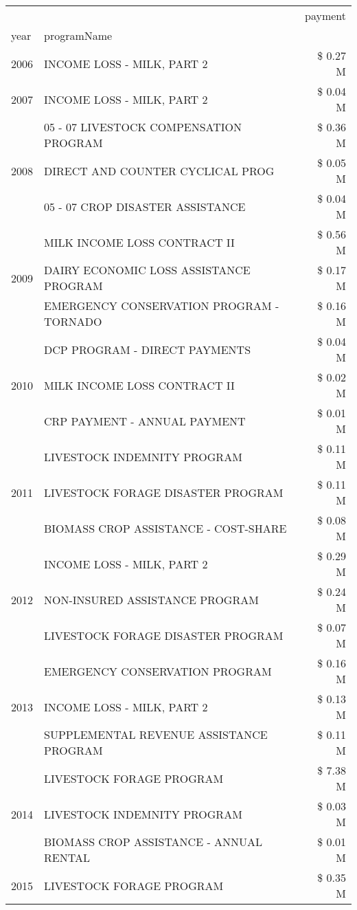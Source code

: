 \begin{tabular}{llr}
\toprule
 &  & payment \\
year & programName &  \\
\midrule
2006 & INCOME LOSS - MILK, PART 2 & \$ 0.27 M \\
\cline{1-3}
2007 & INCOME LOSS - MILK, PART 2 & \$ 0.04 M \\
\cline{1-3}
\multirow[t]{3}{*}{2008} & 05 - 07 LIVESTOCK COMPENSATION PROGRAM & \$ 0.36 M \\
 & DIRECT AND COUNTER CYCLICAL PROG & \$ 0.05 M \\
 & 05 - 07 CROP DISASTER ASSISTANCE & \$ 0.04 M \\
\cline{1-3}
\multirow[t]{3}{*}{2009} & MILK INCOME LOSS CONTRACT II & \$ 0.56 M \\
 & DAIRY ECONOMIC LOSS ASSISTANCE PROGRAM & \$ 0.17 M \\
 & EMERGENCY CONSERVATION PROGRAM - TORNADO & \$ 0.16 M \\
\cline{1-3}
\multirow[t]{3}{*}{2010} & DCP PROGRAM - DIRECT PAYMENTS & \$ 0.04 M \\
 & MILK INCOME LOSS CONTRACT II & \$ 0.02 M \\
 & CRP PAYMENT - ANNUAL PAYMENT & \$ 0.01 M \\
\cline{1-3}
\multirow[t]{3}{*}{2011} & LIVESTOCK INDEMNITY PROGRAM & \$ 0.11 M \\
 & LIVESTOCK FORAGE DISASTER PROGRAM & \$ 0.11 M \\
 & BIOMASS CROP ASSISTANCE - COST-SHARE & \$ 0.08 M \\
\cline{1-3}
\multirow[t]{3}{*}{2012} & INCOME LOSS - MILK, PART 2 & \$ 0.29 M \\
 & NON-INSURED ASSISTANCE PROGRAM & \$ 0.24 M \\
 & LIVESTOCK FORAGE DISASTER PROGRAM & \$ 0.07 M \\
\cline{1-3}
\multirow[t]{3}{*}{2013} & EMERGENCY CONSERVATION PROGRAM & \$ 0.16 M \\
 & INCOME LOSS - MILK, PART 2 & \$ 0.13 M \\
 & SUPPLEMENTAL REVENUE ASSISTANCE PROGRAM & \$ 0.11 M \\
\cline{1-3}
\multirow[t]{3}{*}{2014} & LIVESTOCK FORAGE PROGRAM & \$ 7.38 M \\
 & LIVESTOCK INDEMNITY PROGRAM & \$ 0.03 M \\
 & BIOMASS CROP ASSISTANCE - ANNUAL RENTAL & \$ 0.01 M \\
\cline{1-3}
\multirow[t]{3}{*}{2015} & LIVESTOCK FORAGE PROGRAM & \$ 0.35 M \\

\end{tabular}
